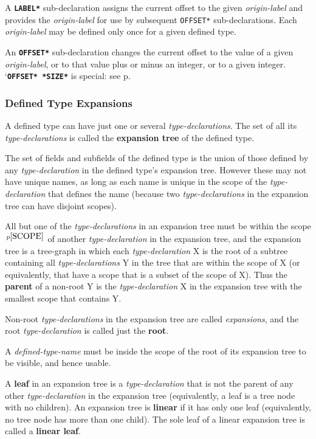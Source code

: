 \documentclass[12pt]{article}
\newcommand{\key}[1]{{\rm \bfseries #1}}
\newcommand{\ttkey}[1]{{\tt \bfseries #1}}
\newcommand{\pagref}[1]{p\pageref{#1}}
\newcommand{\pagnote}[1]{$\,^{p\pageref{#1}}$}
\begin{document}
A \ttkey{*LABEL*} sub-declaration assigns the current offset to the
given {\em origin-label} and provides the {\em origin-label}
for use by subsequent {\tt *OFFSET*} sub-declarations.
Each {\em origin-label} may be defined only once for a given
defined type.

An \ttkey{*OFFSET*} sub-declaration changes the current offset to the value
of a given {\em origin-label}, or to that value plus or minus
an integer, or to a given integer.
`\ttkey{*OFFSET* *SIZE*} is special: see \pagref{OFFSET-SIZE}.

\subsubsection{Defined Type Expansions }
\label{DEFINED-TYPE-EXPANSIONS}

A defined type can have just one or several {\em type-declara\-tions}.
The set of all its {\em type-declarations} is called the
\key{expansion tree} of the defined type.

The set of fields and subfields of the
defined type is
the union of those defined by any {\em type-declaration} in the defined
type's expansion tree.  However these may not have unique names, as long
as each name is unique in the scope of the {\em type-declaration}
that defines the name (because two {\em type-declarations} in the expansion
tree can have disjoint scopes).

All but one of the {\em type-declarations} in an expansion tree must be within
the scope\pagnote{SCOPE} of another {\em type-declaration}
in the expansion tree, and
the expansion tree is a tree-graph in which each {\em type-declaration} X is
the root of a subtree containing all {\em type-declarations} Y
in the tree
that are within the scope of X
(or equivalently, that have a scope
that is a subset of the scope of X).  Thus the \key{parent} of
a non-root Y is the {\em type-declaration} X in the expansion tree
with the smallest scope that contains Y.

Non-root {\em type-declarations} in the expansion tree are called
{\em expansions}, and the root {\em type-declaration} is called just
the \key{root}\label{ROOT}.

A {\em defined-type-name} must be inside the scope of the root of its expansion
tree to be visible, and hence usable.

A \key{leaf} in an expansion tree is a {\em type-declaration} that
is not the parent of any other {\em type-declaration} in the expansion
tree (equivalently, a leaf is a tree node with no children).  An expansion
tree is \key{linear} if it has only one leaf (equivalently, no tree node
has more than one child).
The sole leaf of a linear expansion tree is called a \key{linear leaf}.
\end{document}
